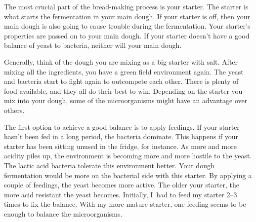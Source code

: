 The most crucial part of the bread-making process is your starter.
The starter is what starts the fermentation in your main dough.
If your starter is off, then your main dough is also going
to cause trouble during the fermentation. Your starter's
properties are passed on to your main dough. If your starter
doesn't have a good balance of yeast to bacteria, neither will your
main dough.

\begin{flowchart}[!htb]
\centering
  
  \caption[Process to prepare your starter before baking]{The process to check
      your sourdough starter when making wheat-based doughs. In practice
      I~frequently use a stiff sourdough starter. The stiff starter features
      enhanced yeast activity. In that case, you can use the same ratios as
      shown in the chart except for the water quantity. The stiff starter has
      a hydration of \qtyrange{50}{60}{\percent}. So you would have half the
      shown water quantities, i.e., if the chart shows \qty{100}{\gram} of
      water, use \qtyrange{50}{60}{\gram} of water for your stiff starter.}%
  \label{fig:process-starter-wheat-sourdough}
\end{flowchart}

Generally, think of the dough you are mixing as a big starter with salt.
After mixing all the ingredients, you have a green field environment again.
The yeast and bacteria start to fight again to outcompete each other.
There is plenty of food available, and they all do their best to win.
Depending on the starter you mix into your dough, some of the microorganisms
might have an advantage over others.

The first option to achieve a good balance is to apply feedings.
If your starter hasn't been fed in a long period, the
bacteria dominate. This happens if your starter has been
sitting unused in the fridge, for instance. As more and more
acidity piles up, the environment is becoming more and more hostile
to the yeast. The lactic acid bacteria tolerate this environment
better. Your dough fermentation would be more on the
bacterial side with this starter. By applying a couple of
feedings, the yeast becomes more active. The older your
starter, the more acid resistant the yeast becomes. Initially,
I~had to feed my starter 2--3 times to fix the balance. With my
more mature starter, one feeding seems to be enough to balance
the microorganisms.

